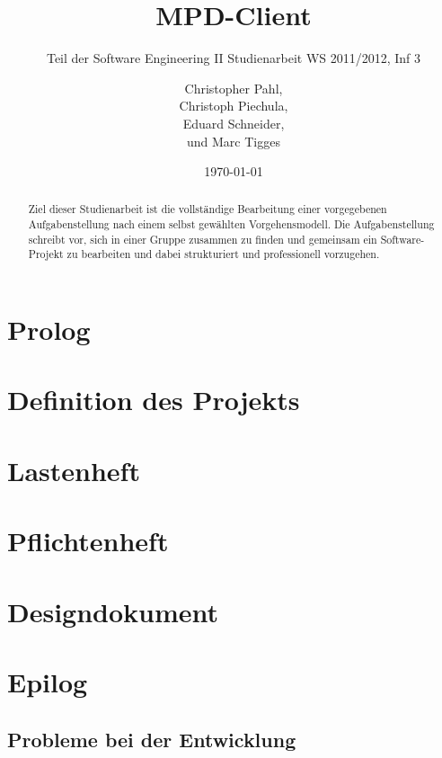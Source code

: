 \documentclass[11pt]{scrreprt}
\title{MPD-Client}
\subtitle{Teil der Software Engineering II Studienarbeit WS 2011/2012, Inf 3}
\author{
Christopher Pahl,\\
Christoph Piechula,\\
Eduard Schneider,\\
und Marc Tigges}
\date{\today}
\begin{document}
\maketitle
\part{Prolog}
\begin{abstract}
Ziel dieser Studienarbeit ist die vollständige Bearbeitung einer vorgegebenen Aufgabenstellung
nach einem selbst gewählten Vorgehensmodell. Die Aufgabenstellung schreibt vor, sich in einer
Gruppe zusammen zu finden und gemeinsam ein Software-Projekt zu bearbeiten und dabei strukturiert
und professionell vorzugehen.
\end{abstract}

\tableofcontents

\part{Definition des Projekts}




\part{Lastenheft}

\part{Pflichtenheft}


\part{Designdokument}







\part{Epilog}
\chapter{Probleme bei der Entwicklung}
\end{document}

